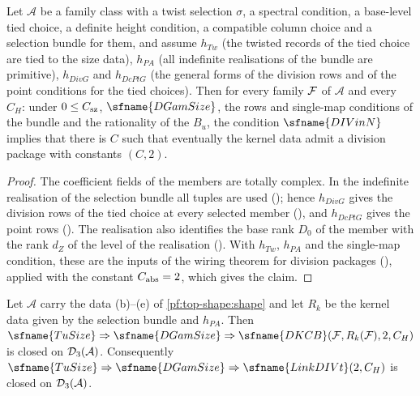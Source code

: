 \begin{lemma}\label{pf:top-shape:wiresel}
Let $\mathcal A$ be a family class with a twist selection $\sigma$, a spectral condition, a base-level tied choice, a
definite height condition, a compatible column choice and a selection bundle for them, and assume $h_{Tw}$ (the twisted
records of the tied choice are tied to the size data), $h_{PA}$ (all indefinite realisations of the bundle are
primitive), $h_{DivG}$ and $h_{DcPtG}$ (the general forms of the division rows and of the point conditions for the tied
choices). Then for every family $\mathcal{F}$ of $\mathcal A$ and every $C_H$: under $0\le C_{\rm sz}$, $\sfname{DGamSize}$,
the rows and single-map conditions of the bundle and the rationality of the $B_u$, the condition $\sfname{DIVinN}$
implies that there is $C$ such that eventually the kernel data admit a division package with constants $(C,2)$.
\end{lemma}

\begin{proof}
The coefficient fields of the members are totally complex. In the indefinite realisation of the selection bundle all
tuples are used (); hence
$h_{DivG}$ gives the division rows of the tied choice at every selected member
(), and $h_{DcPtG}$ gives the point rows
(). The realisation also identifies the base rank $D_0$ of the member with the
rank $d_Z$ of the level of the realisation ().
With $h_{Tw}$, $h_{PA}$ and the single-map condition, these are the inputs of the wiring theorem for division packages
(), applied with the constant $C_{\rm abs}=2$, which gives the claim.
\end{proof}

\begin{proposition}\label{pf:top-shape:bridge}
Let $\mathcal A$ carry the data (b)--(e) of \cref{pf:top-shape:shape} and let $R_k$ be the kernel data given by the
selection bundle and $h_{PA}$. Then $\sfname{TuSize}\Rightarrow\sfname{DGamSize}\Rightarrow\sfname{DKCB}(\topshapeF,
R_k(\topshapeF),2,C_H)$ is closed on $\mathcal{D}_3(\mathcal A)$. Consequently
$\sfname{TuSize}\Rightarrow\sfname{DGamSize}\Rightarrow\sfname{LinkDIVt}(2,C_H)$ is closed on $\mathcal{D}_3(\mathcal A)$.
\end{proposition}

